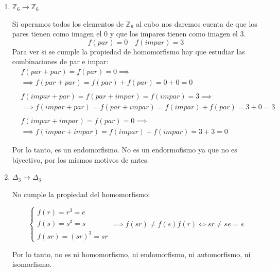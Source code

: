 \documentclass[a4paper,12pt]{article}
\begin{document}
\begin{enumerate}
\begin{enumerate}
        \item $\mathbb{Z}_6 \to \mathbb{Z}_6$

        Si operamos todos los elementos de $\mathbb{Z}_6$ al cubo nos daremos cuenta de que los pares tienen como imagen el 0 y que los impares tienen como imagen el 3.
        $$
        f(par)=0 \quad f(impar)=3
        $$
        Para ver si se cumple la propiedad de homomorfismo hay que estudiar las combinaciones de par e impar:
        \begin{equation*}
            \begin{split}
                & f(par + par) = f(par) = 0 \implies\\
                & \implies f(par + par) = f(par) + f(par) = 0 + 0 = 0\\
                & \\
                & f(impar + par) = f(par + impar) = f(impar) = 3 \implies\\
                & \implies f(impar + par) = f(par + impar) = f(impar) + f(par) = 3 + 0 = 3\\
                & \\
                & f(impar + impar) = f(par) = 0 \implies\\
                & \implies f(impar + impar) = f(impar) + f(impar) = 3 + 3 = 0
            \end{split}
        \end{equation*}

        Por lo tanto, es un endomorfismo. No es un endormofismo ya que no es biyectivo, por los mismos motivos de antes.

        \item $\Delta_{3} \to \Delta_{3}$

        No cumple la propiedad del homomorfismo:

        \begin{equation*}
            \begin{cases}
                f(r) = r^3  = e\\
                f(s) = s^3 = s\\
                f(sr) = (sr)^3 = sr
            \end{cases} \implies f(sr) \neq f(s)f(r) \iff sr \neq se = s
        \end{equation*}

        Por lo tanto, no es ni homomorfismo, ni endomorfismo, ni automorfismo, ni isomorfismo.
    \end{enumerate}


\end{enumerate}
\end{document}
